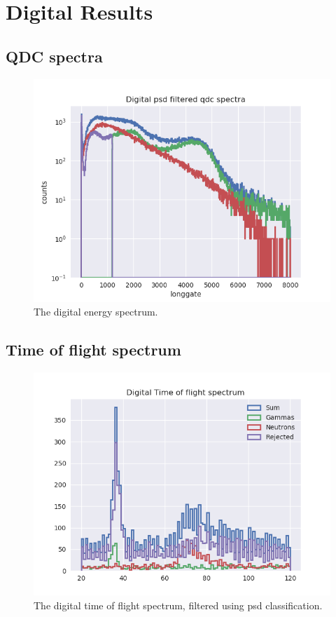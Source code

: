 \documentclass[main.tex]{subfiles}
\begin{document}
\section{Digital Results}
\subsection{QDC spectra}
\begin{figure}[ht]
    \centering
        \includegraphics[scale=.75]{DigitalResults/qdc_psd.png}
        \caption{The digital energy spectrum.}
    \label{fig:D_QDC}
\end{figure}



\newpage
\subsection{Time of flight spectrum}
\begin{figure}[ht!]
    \centering
        \includegraphics[scale=.75]{DigitalResults/tof_psd.png}
        \caption{The digital time of flight spectrum, filtered using psd classification.}
    \label{fig:D_PSD_TOF} 
\end{figure}
\newpage
\end{document}

